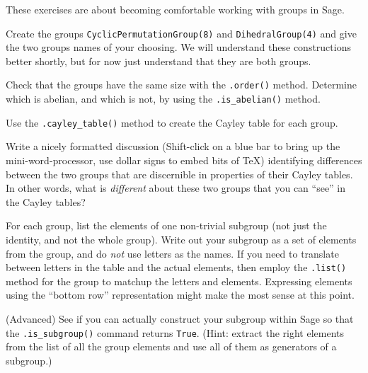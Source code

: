 These exercises are about becoming comfortable working with groups in Sage.
\begin{sageverbatim}\end{sageverbatim}
%
%
Create the groups \verb?CyclicPermutationGroup(8)? and \verb?DihedralGroup(4)? and give the two groups names of your choosing.  We will understand these constructions better shortly, but for now just understand that they are both groups.
\begin{sageverbatim}\end{sageverbatim}
%
%
Check that the groups have the same size with the \verb?.order()? method.  Determine which is abelian, and which is not, by using the \verb?.is_abelian()? method.
\begin{sageverbatim}\end{sageverbatim}
%
%
Use the \verb?.cayley_table()? method to create the Cayley table for each group.
\begin{sageverbatim}\end{sageverbatim}
%
%
Write a nicely formatted discussion (Shift-click on a blue bar to bring up the mini-word-processor, use dollar signs to embed bits of \TeX) identifying differences between the two groups that are discernible in properties of their Cayley tables.  In other words, what is {\em different} about these two groups that you can ``see'' in the Cayley tables?
\begin{sageverbatim}\end{sageverbatim}
%
%
For each group, list the elements of one non-trivial subgroup (not just the identity, and not the whole group).  Write out your subgroup as a set of elements from the group, and do {\em not} use letters as the names.  If you need to translate between letters in the table and the actual elements, then employ the \verb?.list()? method for the group to matchup the letters and elements.  Expressing elements using the ``bottom row'' representation might make the most sense at this point.
\begin{sageverbatim}\end{sageverbatim}
%
%
(Advanced)  See if you can actually construct your subgroup within Sage so that the \verb?.is_subgroup()? command returns \verb?True?.  (Hint: extract the right elements from the list of all the group elements and use all of them as generators of a subgroup.)
\begin{sageverbatim}\end{sageverbatim}
%
